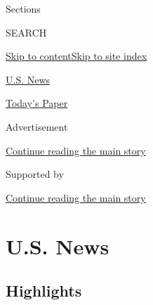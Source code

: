 Sections

SEARCH

\protect\hyperlink{site-content}{Skip to
content}\protect\hyperlink{site-index}{Skip to site index}

\href{https://www.nytimes3xbfgragh.onion/section/us}{U.S. News}

\href{https://myaccount.nytimes3xbfgragh.onion/auth/login?response_type=cookie\&client_id=vi}{}

\href{https://www.nytimes3xbfgragh.onion/section/todayspaper}{Today's
Paper}

Advertisement

\protect\hyperlink{after-top}{Continue reading the main story}

Supported by

\protect\hyperlink{after-sponsor}{Continue reading the main story}

\hypertarget{us-news}{%
\section{U.S. News}\label{us-news}}

\hypertarget{highlights}{%
\subsection{Highlights}\label{highlights}}

